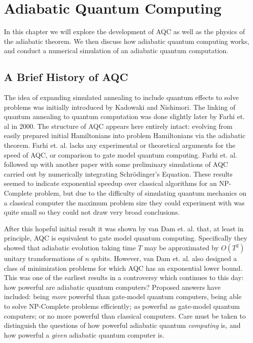 \chapter{Adiabatic Quantum Computing}
\label{chap:aqc}

In this chapter we will explore the development of AQC as well as the physics of the adiabatic theorem.  We then discuss how adiabatic quantum computing works, and conduct a numerical simulation of an adiabatic quantum computation.

\section{A Brief History of AQC}
The idea of expanding simulated annealing to include quantum effects to solve problems was initially introduced by Kadowaki and Nishimori.\cite{transverse}  The linking of quantum annealing to quantum computation was done slightly later by Farhi et. al in 2000.\cite{farhi}  The structure of AQC appears here entirely intact: evolving from easily prepared initial Hamiltonians into problem Hamiltonians via the adiabatic theorem.  Farhi et. al.\cite{farhi} lacks any experimental or theoretical arguments for the speed of AQC, or comparison to gate model quantum computing.  Farhi et. al. followed up with another paper\cite{farhi2} with some preliminary simulations of AQC carried out by numerically integrating Schr\"odinger's Equation.  These results seemed to indicate exponential speedup over classical algorithms for an NP-Complete problem, but due to the difficulty of simulating quantum mechanics on a classical computer the maximum problem size they could experiment with was quite small so they could not draw very broad conclusions.

After this hopeful initial result it was shown by van Dam et. al.\cite{vandam} that, at least in principle, AQC is equivalent to gate model quantum computing.  Specifically they showed that adiabatic evolution taking time $T$ may be approximated by $O(T^2)$ unitary transformations of $n$ qubits.  However, van Dam et. al. also designed a class of minimization problems for which AQC has an exponential lower bound.  This was one of the earliest results in a controversy which continues to this day: how powerful are adiabatic quantum computers?  Proposed answers have included: being \emph{more} powerful than gate-model quantum computers, being able to solve NP-Complete problems efficiently;\cite{geordie}\cite{google} \emph{as} powerful as gate-model quantum computers;\cite{vandam} or no more powerful than classical computers.\cite{speedup}  Care must be taken to distinguish the questions of how powerful adiabatic quantum \emph{computing} is, and how powerful a \emph{given} adiabatic quantum computer is.

